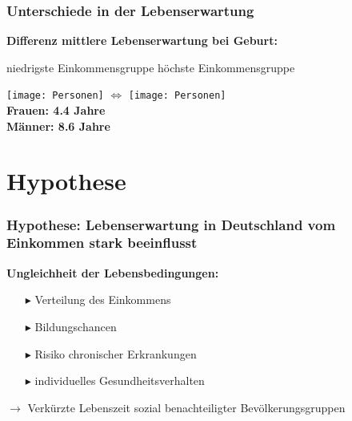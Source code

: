 \documentclass{beamer}
\begin{document}
\begin{frame}
 \frametitle{Unterschiede in der Lebenserwartung}
\textbf{Differenz mittlere Lebenserwartung bei Geburt:}

niedrigste Einkommensgruppe \hfill höchste Einkommensgruppe

\hspace{1.5cm}\texttt{[image: Personen]}\hspace{2cm} 
$\Longleftrightarrow$ \hspace{2cm}\texttt{[image: Personen]}\\
\vspace{0.5cm}
\hspace{4.3cm} \textbf{Frauen: 4.4 Jahre}\\
\hspace{4.3cm} \textbf{Männer: 8.6 Jahre}
     
    
\end{frame}

\section{Hypothese}
\begin{frame}
 \frametitle{Hypothese: Lebenserwartung in Deutschland vom Einkommen stark beeinflusst}
 \textbf{Ungleichheit der Lebensbedingungen:}
 \vspace{0.5cm}
 \begin{itemize}
   \item [$\blacktriangleright$] Verteilung des Einkommens
   \item [$\blacktriangleright$] Bildungschancen
   \item [$\blacktriangleright$] Risiko chronischer Erkrankungen
   \item [$\blacktriangleright$] individuelles Gesundheitsverhalten
 \end{itemize}
 \vspace{0.5cm}
 $\rightarrow$ Verkürzte Lebenszeit sozial benachteiligter Bevölkerungsgruppen
 
\end{frame}
\end{document}
